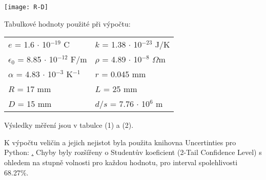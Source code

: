 \documentclass[a4paper,11pt]{article}
\begin{document}
    \hspace{10pt}  
    \begin{minipage}[t]{0.5\textwidth} 
                \vspace{10pt}           
                \par \centering
                \texttt{[image: R-D]}
                \captionsetup{justification=centering, font=footnotesize}
                \label{fig:dif}
                \vspace{10pt}
                \raggedright 
       
                \par Tabulkové hodnoty použité při výpočtu:
                \begin{center}
                    \begin{tabular}{ll}
                        $e$ = 1.6 $\cdot$ 10$^{-19}$ C & $k$ = 1.38 $\cdot$ 10$^{-23}$ J/K \\
                        $\epsilon_0$ = 8.85 $\cdot$ 10$^{-12}$ F/m & $\rho$ = 4.89 $\cdot$ 10$^{-8}$ $\Omega$m \\
                        $\alpha$ = 4.83 $\cdot$ 10$^{-3}$ K$^{-1}$ & $r$ = 0.045 mm \\
                        $R$ = 17 mm & $L$ = 25 mm \\
                        $D$ = 15 mm & $d/s$ = 7.76 $\cdot$ 10$^{6}$ m
                    \end{tabular}
                \end{center}
                \par Výsledky měření jsou v tabulce (1) a (2).
                \vspace{10pt}
                \par K výpočtu veličin a jejich nejistot byla použita knihovna Uncertinties pro Python: \href{pypi.org/project/uncertainties}. Chyby byly rozšířeny o Studentův koeficient (2-Tail Confidence Level) s ohledem na stupně volnosti pro každou hodnotu, pro interval spolehlivosti 68.27\%.

\end{minipage}
\end{document}
